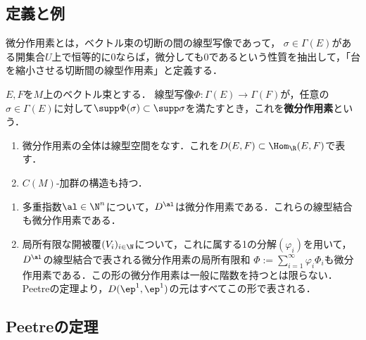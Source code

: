 \documentclass[uplatex,dvipdfmx]{jsreport}
\begin{document}
\subsection{定義と例}

\begin{tcolorbox}[colframe=ForestGreen, colback=ForestGreen!10!white,breakable,colbacktitle=ForestGreen!40!white,coltitle=black,fonttitle=\bfseries\sffamily,
    title=]
    微分作用素とは，ベクトル束の切断の間の線型写像であって，
    $\sigma\in\Gamma(E)$がある開集合$U$上で恒等的に$0$ならば，微分しても$0$であるという性質を抽出して，「台を縮小させる切断間の線型作用素」と定義する．
\end{tcolorbox}

\begin{definition}
    $E,F$を$M$上のベクトル束とする．
    線型写像$\Phi:\Gamma(E)\to\Gamma(F)$が，任意の$\sigma\in\Gamma(E)$に対して$\supp\Phi(\sigma)\subset\supp\sigma$を満たすとき，これを\textbf{微分作用素}という．
\end{definition}

\begin{lemma}\mbox{}
    \begin{enumerate}
        \item 微分作用素の全体は線型空間をなす．これを$D(E,F)\subset\Hom_\R(E,F)$で表す．
        \item $C(M)$-加群の構造も持つ．
    \end{enumerate}
\end{lemma}

\begin{example}\mbox{}
    \begin{enumerate}
        \item 多重指数$\al\in\N^n$について，$D^\al$は微分作用素である．これらの線型結合も微分作用素である．
        \item 局所有限な開被覆$(V_i)_{i\in\N}$について，これに属する1の分解$(\varphi_i)$を用いて，$D^\al$の線型結合で表される微分作用素の局所有限和
        $\Phi:=\sum^\infty_{i=1}\varphi_i\Phi_i$も微分作用素である．この形の微分作用素は一般に階数を持つとは限らない．
        Peetreの定理より，$D(\ep^1,\ep^1)$の元はすべてこの形で表される．
    \end{enumerate}
\end{example}

\subsection{Peetreの定理}
\end{document}
